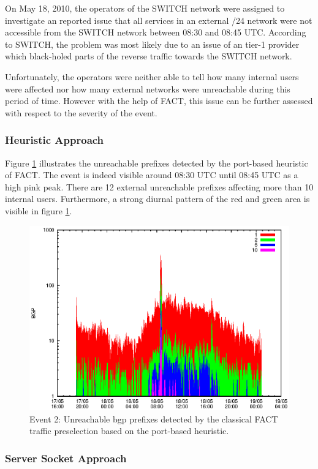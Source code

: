 On May 18, 2010, the operators of the SWITCH network were assigned to 
investigate an reported issue that all services in an external /24 network were 
not accessible from the SWITCH network between 08:30 and 08:45 UTC. According to 
SWITCH, the problem was most likely due to an issue of an tier-1 provider which 
black-holed parts of the reverse traffic towards the SWITCH 
network\citep{SchatzmannPAM2011}.

Unfortunately, the operators were neither able to tell how many internal users 
were affected nor how many external networks were unreachable during this period 
of time. However with the help of \gls{FACT}, this issue can be further assessed 
with respect to the severity of the event\citep{SchatzmannPAM2011}.

\subsubsection{Heuristic Approach}

Figure \ref{fig:TIER1_FACT_REF} illustrates the unreachable prefixes detected by 
the port-based heuristic of \gls{FACT}. The event is indeed visible around 08:30 
UTC until 08:45 UTC as a high pink peak. There are 12 external unreachable 
prefixes affecting more than 10 internal users. Furthermore, a strong diurnal 
pattern of the red and green area is visible in figure \ref{fig:TIER1_FACT_REF}. 

\begin{figure}
	[p] \centering 
	\includegraphics[width=0.75\linewidth]{images/events/2010_05_18/bgp_log_port80_ref.eps} \caption{Event 2: Unreachable \gls{bgp} prefixes detected by the classical \gls{FACT} traffic preselection based on the port-based heuristic.} 
	\label{fig:TIER1_FACT_REF} 
\end{figure}

\subsubsection{Server Socket Approach}


